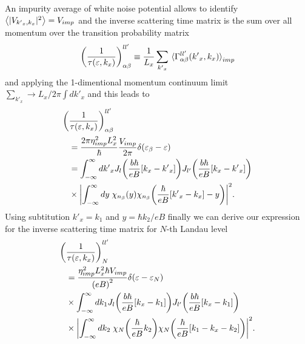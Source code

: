 An impurity average of white noise potential allows to identify $\expval{|V_{{k'}_x,k_x}|^2} = V_{imp}$ and the inverse scattering time matrix is the sum over all momentum over the transition probability matrix
\begin{equation} \label{eq_41}
    \qty(\frac{1}{\tau(\varepsilon,k_x)})^{ll'}_{\alpha\beta} \equiv
    \frac{1}{L_x} \sum_{{k'}_x}
    \expval**{\Gamma_{\alpha\beta}^{ll'}({k'}_x,k_x)}_{imp}
\end{equation}
and applying the 1-dimentional momentum continuum limit $\sum_{{k'}_x} \longrightarrow {L_x}/{2\pi}\int d {k'}_x$ and this leads to
\begin{equation} \label{eq_42}
  \begin{aligned}
    \bigg(&\frac{1}{\tau(\varepsilon,k_x)}\bigg)^{ll'}_{\alpha\beta} \\
    & =
    \frac { 2\pi \eta_{imp}^2 L_x^2}{ \hbar}
    \frac{V_{imp}}{2\pi}
    \delta(\varepsilon_{\beta} - \varepsilon)\\
    & =
    \int_{-\infty}^{\infty} d {k'}_x
    J_l\qty(\frac{b\hbar}{eB}[{k}_x - {k'}_x])
    J_{l'}\qty(\frac{b\hbar}{eB}[{k}_x - {k'}_x]) \\
    & \times
    \qty|
    \int_{-\infty}^{\infty} dy \;
    {\chi}_{n_{\beta}}\qty(y)
    {\chi}_{n_{\beta}}\qty(\frac{\hbar}{eB} \qty[{k'}_x - {k}_x] - y)|^2.
  \end{aligned}
\end{equation}
Using subtitution $k'_x = k_1$ and $y = {\hbar{k_2}}/{eB}$ finally we can derive our expression for the inverse scattering time matrix for $N$-th Landau
level
\begin{equation} \label{eq_43}
  \begin{aligned}
    \bigg(&\frac{1}{\tau(\varepsilon,k_x)}\bigg)^{ll'}_{N} \\
    & =
    \frac { \eta_{imp}^2 L_x^2 \hbar V_{imp}}{\qty(eB)^2}
    \delta(\varepsilon - \varepsilon_{N})\\
    & \times
    \int_{-\infty}^{\infty} d k_1
    J_l\qty(\frac{b\hbar}{eB}[{k}_x - k_1])
    J_{l'}\qty(\frac{b\hbar}{eB}[{k}_x - k_1]) \\
    & \times
    \qty|
    \int_{-\infty}^{\infty} dk_2 \;
    {\chi}_{N}\qty(\frac{\hbar}{eB}k_2)
    {\chi}_{N}\qty(\frac{\hbar}{eB} \qty[k_1 - {k}_x - k_2])|^2.
  \end{aligned}
\end{equation}
